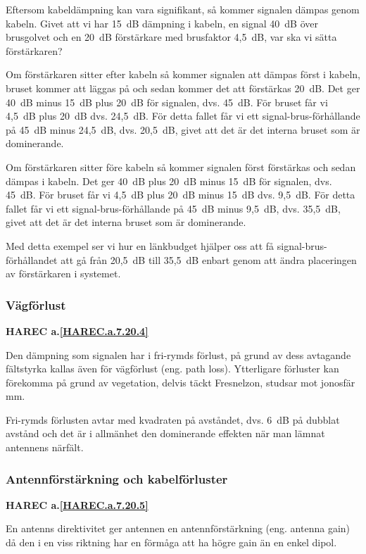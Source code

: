 Eftersom kabeldämpning kan vara signifikant, så kommer signalen dämpas genom
kabeln.
Givet att vi har 15~dB dämpning i kabeln, en signal 40~dB över brusgolvet och
en 20~dB förstärkare med brusfaktor 4,5~dB, var ska vi sätta förstärkaren?

Om förstärkaren sitter efter kabeln så kommer signalen att dämpas först i
kabeln, bruset kommer att läggas på och sedan kommer det att förstärkas 20~dB.
Det ger 40~dB minus 15~dB plus 20~dB för signalen, dvs. 45~dB.
För bruset får vi 4,5~dB plus 20~dB dvs. 24,5~dB.
För detta fallet får vi ett signal-brus-förhållande på 45~dB minus 24,5~dB,
dvs. 20,5~dB, givet att det är det interna bruset som är dominerande.

Om förstärkaren sitter före kabeln så kommer signalen först förstärkas och
sedan dämpas i kabeln.
Det ger 40~dB plus 20~dB minus 15~dB för signalen, dvs. 45~dB.
För bruset får vi 4,5~dB plus 20~dB minus 15~dB dvs. 9,5~dB.
För detta fallet får vi ett signal-brus-förhållande på 45~dB minus 9,5~dB,
dvs. 35,5~dB, givet att det är det interna bruset som är dominerande.

Med detta exempel ser vi hur en länkbudget hjälper oss att få
signal-brus-förhållandet att gå från 20,5~dB till 35,5~dB enbart genom att
ändra placeringen av förstärkaren i systemet.

\subsubsection{Vägförlust}
\textbf{HAREC a.\ref{HAREC.a.7.20.4}\label{myHAREC.a.7.20.4}}

Den dämpning som signalen har i fri-rymds förlust, på grund av dess avtagande
fältstyrka kallas även för vägförlust (eng. path loss).
Ytterligare förluster kan förekomma på grund av vegetation, delvis täckt
Fresnelzon, studsar mot jonosfär mm.

Fri-rymds förlusten avtar med kvadraten på avståndet, dvs. 6~dB på dubblat
avstånd och det är i allmänhet den dominerande effekten när man lämnat
antennens närfält.

\subsubsection{Antennförstärkning och kabelförluster}
\textbf{HAREC a.\ref{HAREC.a.7.20.5}\label{myHAREC.a.7.20.5}}

En antenns direktivitet ger antennen en antennförstärkning (eng. antenna gain)
då den i en viss riktning har en förmåga att ha högre gain än en enkel dipol.

